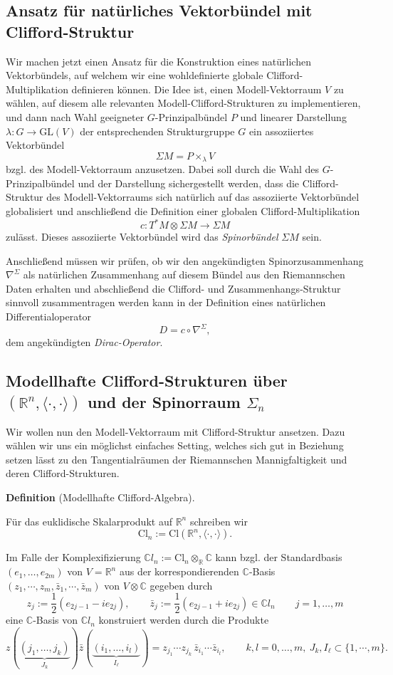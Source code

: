 \documentclass[10pt, letterpaper]{article}
\newcommand{\SKP}{\langle\cdot,\cdot\rangle}
\newcommand{\R}{\mathbb{R}}
\newcommand{\C}{\mathbb{C}}
\newcommand{\Cl}{\mathrm{Cl}}
\newcommand{\GL}{\mathrm{GL}}
\newcommand{\CustomHeading}[3]{%
  \par\medskip\noindent%
  \textbf{#1 #2} \textnormal{(#3)}.\enskip%
}
\newenvironment{DEF}[2]{\CustomHeading{Definition}{#1}{#2}}{}
\begin{document}
\subsection{Ansatz für natürliches Vektorbündel mit Clifford-Struktur}

Wir machen jetzt einen Ansatz für die Konstruktion eines natürlichen Vektorbündels, auf welchem wir eine wohldefinierte globale Clifford-Multiplikation definieren können. Die Idee ist, einen Modell-Vektorraum $V$ zu wählen, auf diesem alle relevanten Modell-Clifford-Strukturen zu implementieren, und dann nach Wahl geeigneter $G$-Prinzipalbündel $P$ und linearer Darstellung $\lambda:G\to\GL(V)$ der entsprechenden Strukturgruppe $G$ ein assoziiertes Vektorbündel 
$$\Sigma M= P\times_\lambda V$$
bzgl. des Modell-Vektorraum anzusetzen. Dabei soll durch die Wahl des $G$-Prinzipalbündel und der Darstellung sichergestellt werden, dass die Clifford-Struktur des Modell-Vektorraums sich natürlich auf das assoziierte Vektorbündel globalisiert und anschließend die Definition einer globalen Clifford-Multiplikation 
$$c:T^*M\otimes \Sigma M\to \Sigma M$$
zulässt. Dieses assoziierte Vektorbündel wird das \emph{Spinorbündel} $\Sigma M$ sein.

Anschließend müssen wir prüfen, ob wir den angekündigten Spinorzusammenhang $\nabla^\Sigma$ als natürlichen Zusammenhang auf diesem Bündel aus den Riemannschen Daten erhalten und abschließend die Clifford- und Zusammenhangs-Struktur sinnvoll zusammentragen werden kann in der Definition eines natürlichen Differentialoperator 
$$D=c\circ \nabla^\Sigma,$$ dem angekündigten \emph{Dirac-Operator}.

\subsection{Modellhafte Clifford-Strukturen über $(\R^n,\SKP)$ und der Spinorraum $\Sigma_n$}

Wir wollen nun den Modell-Vektorraum mit Clifford-Struktur ansetzen. Dazu wählen wir uns ein möglichst einfaches Setting, welches sich gut in Beziehung setzen lässt zu den Tangentialräumen der Riemannschen Mannigfaltigkeit und deren Clifford-Strukturen.


\begin{DEF}{}{Modellhafte Clifford-Algebra}
Für das euklidische Skalarprodukt auf \(\mathbb{R}^n\) schreiben wir
\[
\Cl_n:=\Cl(\mathbb{R}^n,\SKP).
\]

Im Falle der Komplexifizierung $\C l_n:= \Cl_n\otimes_{\R}\C$ kann bzgl. der Standardbasis $(e_1,…,e_{2m})$ von $V=\R^n$ aus der korrespondierenden $\C$-Basis $(z_1,\cdots,z_m,\bar{z}_1,\cdots,\bar{z}_m)$ von $V\otimes \C$ gegeben durch
\[
z_j:=\frac12(e_{2j-1}-i e_{2j}),\qquad
\bar z_j:=\frac12(e_{2j-1}+i e_{2j})\in \C l_n\qquad  j=1,\dots,m
\] 
eine $\C$-Basis von $\C l_n$ konstruiert werden durch die Produkte
$$ z(\underbrace{(j_1,…,j_k)}_{J_k}) \bar{z}(\underbrace{(i_1,…,i_l)}_{I_\ell})=z_{j_1}\cdots z_{j_k}\,\bar z_{i_1}\cdots \bar z_{i_l},
\qquad k,l=0,\dots,m,\  J_k,I_\ell\subset \{1,\cdots,m\}.$$
\end{DEF}
\end{document}
